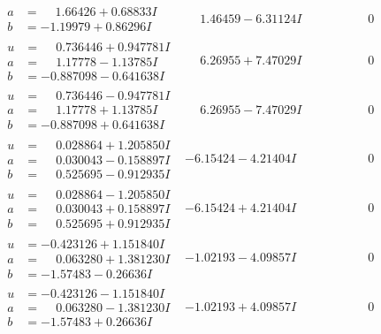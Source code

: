 \documentclass[1p]{elsarticle_modified}
\theoremstyle{definition}
\begin{document}
$$\begin{array}{c|c|c}
\begin{aligned}
a &= \phantom{-}1.66426 + 0.68833 I \\
b &= -1.19979 + 0.86296 I\end{aligned}
 & \phantom{-}1.46459 - 6.31124 I & \phantom{-0.000000 } 0 \\ \hline\begin{aligned}
u &= \phantom{-}0.736446 + 0.947781 I \\
a &= \phantom{-}1.17778 - 1.13785 I \\
b &= -0.887098 - 0.641638 I\end{aligned}
 & \phantom{-}6.26955 + 7.47029 I & \phantom{-0.000000 } 0 \\ \hline\begin{aligned}
u &= \phantom{-}0.736446 - 0.947781 I \\
a &= \phantom{-}1.17778 + 1.13785 I \\
b &= -0.887098 + 0.641638 I\end{aligned}
 & \phantom{-}6.26955 - 7.47029 I & \phantom{-0.000000 } 0 \\ \hline\begin{aligned}
u &= \phantom{-}0.028864 + 1.205850 I \\
a &= \phantom{-}0.030043 - 0.158897 I \\
b &= \phantom{-}0.525695 - 0.912935 I\end{aligned}
 & -6.15424 - 4.21404 I & \phantom{-0.000000 } 0 \\ \hline\begin{aligned}
u &= \phantom{-}0.028864 - 1.205850 I \\
a &= \phantom{-}0.030043 + 0.158897 I \\
b &= \phantom{-}0.525695 + 0.912935 I\end{aligned}
 & -6.15424 + 4.21404 I & \phantom{-0.000000 } 0 \\ \hline\begin{aligned}
u &= -0.423126 + 1.151840 I \\
a &= \phantom{-}0.063280 + 1.381230 I \\
b &= -1.57483 - 0.26636 I\end{aligned}
 & -1.02193 - 4.09857 I & \phantom{-0.000000 } 0 \\ \hline\begin{aligned}
u &= -0.423126 - 1.151840 I \\
a &= \phantom{-}0.063280 - 1.381230 I \\
b &= -1.57483 + 0.26636 I\end{aligned}
 & -1.02193 + 4.09857 I & \phantom{-0.000000 } 0\\

\end{array}$$
\end{document}
